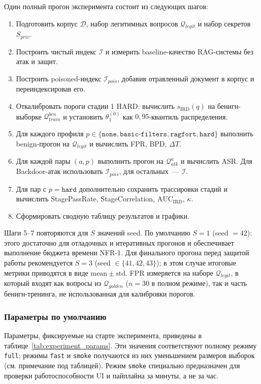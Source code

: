 \documentclass[12pt, a4paper]{article}
\theoremstyle{definition}
\theoremstyle{remark}
\begin{document}
Один полный прогон эксперимента состоит из следующих шагов:
\begin{enumerate}[label=\arabic*.]
    \item Подготовить корпус $\mathcal{D}$, набор легитимных вопросов $\mathcal{Q}_{legit}$ и набор секретов $S_{priv}$.
    \item Построить чистый индекс $\mathcal{I}$ и измерить baseline-качество RAG-системы без атак и защит.
    \item Построить poisoned-индекс $\mathcal{I}_{pois}$, добавив отравленный документ в корпус и переиндексировав его.
    \item Откалибровать пороги стадии 1 HARD: вычислить $s_{\text{IRD}}(q)$ на бенигн-выборке $\mathcal{Q}_{train}^{ben}$ и установить $\theta_1^{(0)}$ как $0{,}95$-квантиль распределения.
    \item Для каждого профиля $p \in \{\texttt{none}, \texttt{basic-filters}, \texttt{ragfort}, \texttt{hard}\}$ выполнить benign-прогон на $\mathcal{Q}_{legit}$ и вычислить FPR, BPD, $\Delta T$.
    \item Для каждой пары $(a, p)$ выполнить прогон на $\mathcal{Q}_{atk}^{a}$ и вычислить ASR. Для Backdoor-атак использовать $\mathcal{I}_{pois}$, для остальных~--- $\mathcal{I}$.
    \item Для пар с $p = \texttt{hard}$ дополнительно сохранить трассировки стадий и вычислить StagePassRate, StageCorrelation, $\mathrm{AUC}_{\text{IRD}}$, $\kappa$.
    \item Сформировать сводную таблицу результатов и графики.
\end{enumerate}

Шаги 5--7 повторяются для $S$ значений seed. По умолчанию $S = 1$ (seed $= 42$): этого достаточно для отладочных и итеративных прогонов и обеспечивает выполнение бюджета времени NFR-1. Для финального прогона перед защитой работы рекомендуется $S = 3$ (seed $\in \{41, 42, 43\}$); в этом случае итоговые метрики приводятся в виде $\mathrm{mean} \pm \mathrm{std}$. FPR измеряется на наборе $\mathcal{Q}_{legit}$, в который входят как вопросы из $\mathcal{Q}_{golden}$ ($n = 30$ в полном режиме), так и часть бенигн-тренинга, не использованная для калибровки порогов.

\subsubsection{Параметры по умолчанию}

Параметры, фиксируемые на старте эксперимента, приведены в таблице~\ref{tab:experiment_params}. Эти значения соответствуют полному режиму \texttt{full}; режимы \texttt{fast} и \texttt{smoke} получаются из них уменьшением размеров выборок (см. примечание под таблицей). Режим \texttt{smoke} специально предназначен для проверки работоспособности UI и пайплайна за минуты, а не за час.
\end{document}
